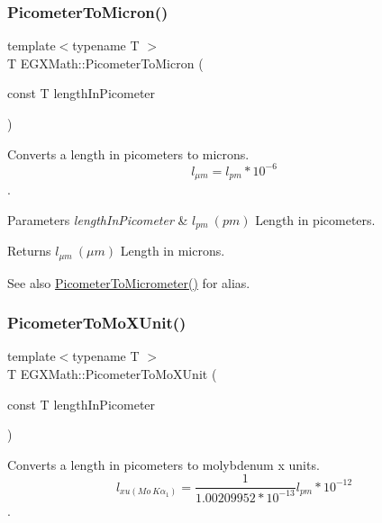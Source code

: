 \subsubsection{\texorpdfstring{Picometer\+To\+Micron()}{PicometerToMicron()}}
{\footnotesize\ttfamily template$<$typename T $>$ \\
T E\+G\+X\+Math\+::\+Picometer\+To\+Micron (\begin{DoxyParamCaption}\item[{const T}]{length\+In\+Picometer }\end{DoxyParamCaption})}



Converts a length in picometers to microns. \[ l_{\mu m}=l_{pm} * 10^{-6} \]. 


\begin{DoxyParams}{Parameters}
{\em length\+In\+Picometer} & $ l_{pm}\ (pm)$ Length in picometers. \\
\hline
\end{DoxyParams}
\begin{DoxyReturn}{Returns}
$ l_{\mu m}\ (\mu m)$ Length in microns. 
\end{DoxyReturn}
\begin{DoxySeeAlso}{See also}
\mbox{\hyperlink{group___e_g_x_math-_conversions-_length_conversions-_picometer-_s_i_gacf7ccbf7130894f8a9075cb9fd66c67d}{Picometer\+To\+Micrometer()}} for alias. 
\end{DoxySeeAlso}
\mbox{\label{group___e_g_x_math-_conversions-_length_conversions-_picometer-_non-_s_i_ga51b96b4bb30b7e9c971db81ff89a82f8}} 
\subsubsection{\texorpdfstring{Picometer\+To\+Mo\+X\+Unit()}{PicometerToMoXUnit()}}
{\footnotesize\ttfamily template$<$typename T $>$ \\
T E\+G\+X\+Math\+::\+Picometer\+To\+Mo\+X\+Unit (\begin{DoxyParamCaption}\item[{const T}]{length\+In\+Picometer }\end{DoxyParamCaption})}



Converts a length in picometers to molybdenum x units. \[ l_{xu(Mo\ K\alpha_1)}=\frac{1}{1.00209952*10^{-13}} l_{pm} * 10^{-12}\]. 


